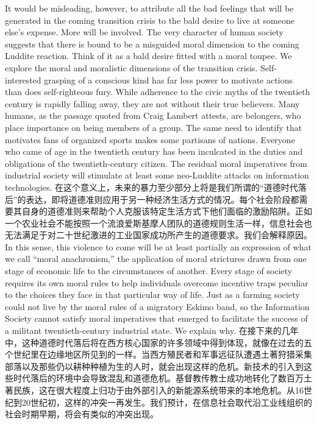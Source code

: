 \begin{paracol}{2}[]
It would be misleading, however, to attribute all the bad feelings that will be generated in the coming transition crisis to the bald desire to live at someone else's expense. More will be involved. The very character of human society suggests that there is bound to be a misguided moral dimension to the coming Luddite reaction. Think of it as a bald desire fitted with a moral toupee. We explore the moral and moralistic dimensions of the transition crisis. Self-interested grasping of a conscious kind has far less power to motivate actions than does self-righteous fury. While adherence to the civic myths of the twentieth century is rapidly falling away, they are not without their true believers. Many humans, as the passage quoted from Craig Lambert attests, are belongers, who place importance on being members of a group. The same need to identify that motivates fans of organized sports makes some partisans of nations. Everyone who came of age in the twentieth century has been inculcated in the duties and obligations of the twentieth-century citizen. The residual moral imperatives from industrial society will stimulate at least some neo-Luddite attacks on information technologies.
\switchcolumn*
在这个意义上，未来的暴力至少部分上将是我们所谓的“道德时代落后”的表达，即将道德准则应用于另一种经济生活方式的情况。每个社会阶段都需要其自身的道德准则来帮助个人克服该特定生活方式下他们面临的激励陷阱。正如一个农业社会不能按照一个流浪爱斯基摩人团队的道德规则生活一样，信息社会也无法满足于对二十世纪激进的工业国家成功所产生的道德要求。我们会解释原因。
\switchcolumn
In this sense, this violence to come will be at least partially an expression of what we call “moral anachronism,” the application of moral strictures drawn from one stage of economic life to the circumstances of another. Every stage of society requires its own moral rules to help individuals overcome incentive traps peculiar to the choices they face in that particular way of life. Just as a farming society could not live by the moral rules of a migratory Eskimo band, so the Information Society cannot satisfy moral imperatives that emerged to facilitate the success of a militant twentieth-century industrial state. We explain why.
\switchcolumn*
在接下来的几年中，这种道德时代落后将在西方核心国家的许多领域中得到体现，就像在过去的五个世纪里在边缘地区所见到的一样。当西方殖民者和军事远征队遭遇土著狩猎采集部落以及那些仍以耕种种植为生的人时，就会出现这样的危机。新技术的引入到这些时代落后的环境中会导致混乱和道德危机。基督教传教士成功地转化了数百万土著民族，这在很大程度上归功于由外部引入的新能源系统带来的本地危机。从16世纪到20世纪初，这样的冲突一再发生。我们预计，在信息社会取代沿工业线组织的社会时期早期，将会有类似的冲突出现。

\end{paracol}
